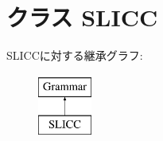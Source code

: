\hypertarget{classslicc_1_1parser_1_1SLICC}{
\section{クラス SLICC}
\label{classslicc_1_1parser_1_1SLICC}
}
SLICCに対する継承グラフ:\begin{figure}[H]
\begin{center}
\leavevmode
\includegraphics[height=2cm]{classslicc_1_1parser_1_1SLICC}
\end{center}
\end{figure}
